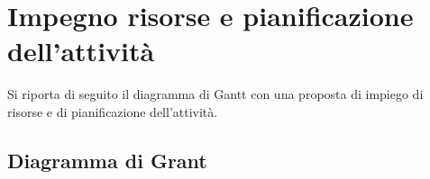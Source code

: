 %
%	 
%

\chapter{Impegno risorse e pianificazione dell'attività}

Si riporta di seguito il diagramma di Gantt con una proposta di impiego di risorse e di pianificazione
dell'attività.

\section{Diagramma di Grant}


